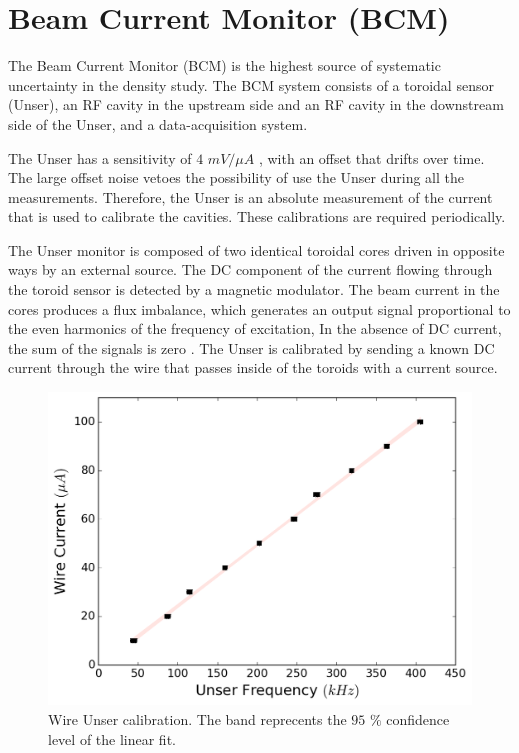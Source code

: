 \documentclass[final,5p,times,twocolumn,balance]{elsarticle}
\begin{document}
\section{Beam Current Monitor (BCM)}
\label{BCM}

The Beam Current Monitor (BCM) is the highest source of systematic uncertainty in the density study. The BCM system consists of a toroidal sensor (Unser), an RF cavity in the upstream side and an RF cavity in the downstream side of the Unser, and a data-acquisition system.  

The Unser has a sensitivity of $4$ $mV/\mu A$ \cite{denard}, with an offset that drifts over time. The large offset noise vetoes the possibility of use the Unser during all the measurements. Therefore, the Unser is an absolute measurement of the current that is used to calibrate the cavities. These calibrations are required periodically.

The Unser monitor is composed of two identical toroidal cores driven in opposite ways by an external source.  The DC component of the current flowing through the toroid sensor is detected by a magnetic modulator. The beam current in the cores produces a flux imbalance, which generates an output signal proportional to the even harmonics of the frequency of excitation, In the absence of DC current, the sum of the signals is zero \cite{denard}. The Unser is calibrated by sending a known DC current through the wire that passes inside of the toroids with a current source.  


\begin{figure}[!h]
    \centering
    \includegraphics[width=\linewidth]{images/unser_calibration.pdf}
    \caption{Wire Unser calibration. The band reprecents the $95$ $\%$ confidence level of the linear fit.}
    \label{fig:unser_cal}
\end{figure}
  
\end{document}
